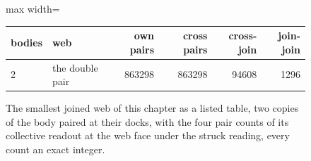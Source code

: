 \begin{figure}[h]\centering
\begin{adjustbox}{max width=\linewidth}\begin{tabular}{llrrrr}\hline bodies & web & own pairs & cross pairs & cross-join & join-join \\ \hline 2 & the double pair & 863298 & 863298 & 94608 & 1296 \\ \hline \end{tabular}\end{adjustbox}
\caption{The smallest joined web of this chapter as a listed table, two copies of the body paired at their docks, with the four pair counts of its collective readout at the web face under the struck reading, every count an exact integer.}
\end{figure}
\par\medskip{}\label{narr:close:2-4}\par
